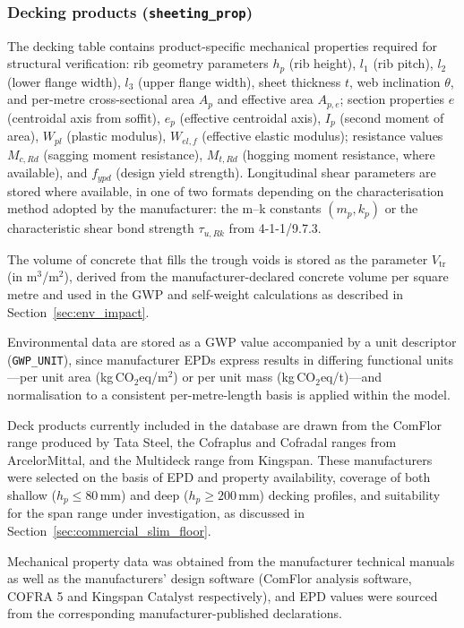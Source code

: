 \subsubsection*{Decking products (\texttt{sheeting\_prop})}
The decking table contains product-specific mechanical properties required for structural verification: rib geometry parameters $h_p$ (rib height), $l_1$ (rib pitch), $l_2$ (lower flange width), $l_3$ (upper flange width), sheet thickness $t$, web inclination $\theta$, and per-metre cross-sectional area $A_p$ and effective area $A_{p,e}$; section properties $e$ (centroidal axis from soffit), $e_p$ (effective centroidal axis), $I_p$ (second moment of area), $W_{pl}$ (plastic modulus), $W_{el,f}$ (effective elastic modulus); resistance values $M_{c,Rd}$ (sagging moment resistance), $M_{t,Rd}$ (hogging moment resistance, where available), and $f_{ypd}$ (design yield strength). Longitudinal shear parameters are stored where available, in one of two formats depending on the characterisation method adopted by the manufacturer: the m--k constants $(m_p, k_p)$ or the characteristic shear bond strength $\tau_{u,Rk}$ from 4-1-1/9.7.3.

The volume of concrete that fills the trough voids is stored as the parameter $V_\mathrm{tr}$ (in m$^3$/m$^2$), derived from the manufacturer-declared concrete volume per square metre and used in the GWP and self-weight calculations as described in Section~\ref{sec:env_impact}.

Environmental data are stored as a GWP value accompanied by a unit descriptor (\texttt{GWP\_UNIT}), since manufacturer EPDs express results in differing functional units---per unit area (kg\,CO$_2$eq/m$^2$) or per unit mass (kg\,CO$_2$eq/t)---and normalisation to a consistent per-metre-length basis is applied within the model.

Deck products currently included in the database are drawn from the ComFlor range produced by Tata Steel, the Cofraplus and Cofradal ranges from ArcelorMittal, and the Multideck range from Kingspan. These manufacturers were selected on the basis of EPD and property availability, coverage of both shallow ($h_p \le 80$\,mm) and deep ($h_p \ge 200$\,mm) decking profiles, and suitability for the span range under investigation, as discussed in Section~\ref{sec:commercial_slim_floor}.

Mechanical property data was obtained from the manufacturer technical manuals \citep{RefWorks:2017comflor, RefWorks:2021floors, RefWorks:kingspan2026multideck} as well as the manufacturers' design software (ComFlor analysis software, COFRA 5 and Kingspan Catalyst respectively), and EPD values were sourced from the corresponding manufacturer-published declarations. 


